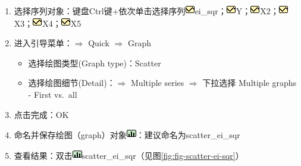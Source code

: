 \documentclass[12pt,(landscape,a4paper),(portrait,a4paper)]{article}
\providecommand{\tightlist}{%
  \setlength{\itemsep}{0pt}\setlength{\parskip}{0pt}}
\begin{document}
\begin{itemize}
\begin{enumerate}
    \begin{enumerate}
    \def\labelenumii{\alph{enumii}.}
    \tightlist
    \item
      选择序列对象：键盘Ctrl键+依次单击选择序列\includegraphics{picture/object/Series.png}ei\_sqr；\includegraphics{picture/object/Series.png}Y；\includegraphics{picture/object/Series.png}X2；\includegraphics{picture/object/Series.png}X3；\includegraphics{picture/object/Series.png}X4；\includegraphics{picture/object/Series.png}X5
    \item
      进入引导菜单：\(\Rightarrow\) Quick \(\Rightarrow\) Graph

      \begin{itemize}
      \tightlist
      \item
        选择绘图类型(Graph type)：Scatter
      \item
        选择绘图细节(Detail)：\(\Rightarrow\) Multiple series
        \(\Rightarrow\) 下拉选择 Multiple graphs - First vs.~all
      \end{itemize}
    \item
      点击完成：OK
    \item
      命名并保存绘图（graph）对象\includegraphics{picture/object/Graph.png}：建议命名为scatter\_ei\_sqr
    \item
      查看结果：双击\includegraphics{picture/object/Graph.png}scatter\_ei\_sqr（见图\ref{fig:fig-scatter-ei-sqr}）
    \end{enumerate}
  \end{enumerate}
\end{itemize}
\end{document}

